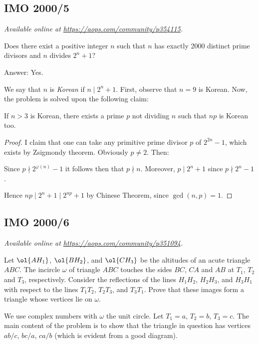 \documentclass[11pt]{scrartcl}
\begin{document}
\subsection{IMO 2000/5}
\textsl{Available online at \url{https://aops.com/community/p354115}.}
\begin{mdframed}[style=mdpurplebox,frametitle={Problem statement}]
Does there exist a positive integer $n$
such that $n$ has exactly 2000 distinct prime divisors
and $n$ divides $2^n + 1$?
\end{mdframed}
Answer: Yes.

We say that $n$ is \emph{Korean} if $n \mid 2^n+1$.
First, observe that $n=9$ is Korean.
Now, the problem is solved upon the following claim:
\begin{claim*}
  If $n > 3$ is Korean,
  there exists a prime $p$ not dividing $n$
  such that $np$ is Korean too.
\end{claim*}
\begin{proof}
  I claim that one can take any primitive prime divisor $p$ of $2^{2n}-1$,
  which exists by Zsigmondy theorem.
  Obviously $p \neq 2$.
  Then:
  \begin{itemize}
    \ii Since $p \nmid 2^{\varphi(n)}-1$ it follows then that $p \nmid n$.
    \ii Moreover, $p \mid 2^n+1$ since $p \nmid 2^n-1$.
  \end{itemize}
  Hence $np \mid 2^n+1 \mid 2^{np} + 1$ by Chinese Theorem,
  since $\gcd(n,p) = 1$.
\end{proof}
\pagebreak

\subsection{IMO 2000/6}
\textsl{Available online at \url{https://aops.com/community/p351094}.}
\begin{mdframed}[style=mdpurplebox,frametitle={Problem statement}]
Let $\ol{AH_1}$, $\ol{BH_2}$, and $\ol{CH_3}$ be the
altitudes of an acute triangle $ABC$.
The incircle $\omega$ of triangle $ABC$ touches the sides
$BC$, $CA$ and $AB$ at $T_1$, $T_2$ and $T_3$, respectively.
Consider the reflections of the lines $H_1H_2$, $H_2H_3$, and
$H_3H_1$ with respect to the lines $T_1T_2$, $T_2T_3$, and $T_3T_1$.
Prove that these images form a triangle whose vertices lie on $\omega$.
\end{mdframed}
We use complex numbers with $\omega$ the unit circle.
Let $T_1 = a$, $T_2 = b$, $T_3 = c$.
The main content of the problem is to show that
the triangle in question has vertices
$ab/c$, $bc/a$, $ca/b$
(which is evident from a good diagram).
\end{document}
